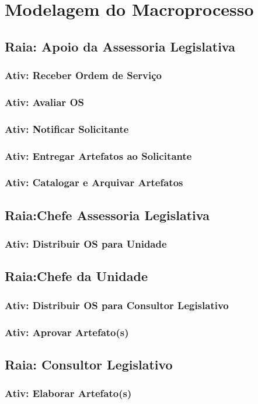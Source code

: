 \chapter{Modelagem do Macroprocesso}

	\section{Raia: Apoio da Assessoria Legislativa}

		\subsection{Ativ: Receber Ordem de Serviço}
		
		\subsection{Ativ: Avaliar OS}
				
		\subsection{Ativ: Notificar Solicitante}
		
		\subsection{Ativ: Entregar Artefatos ao Solicitante}		
		
		\subsection{Ativ: Catalogar e Arquivar Artefatos}		


	\section{Raia:Chefe Assessoria Legislativa}

		\subsection{Ativ: Distribuir OS para Unidade}		


	\section{Raia:Chefe da Unidade}

		\subsection{Ativ: Distribuir OS para Consultor Legislativo}		
		
		\subsection{Ativ: Aprovar Artefato(s)}		
		

	\section{Raia: Consultor Legislativo}

		\subsection{Ativ: Elaborar Artefato(s)}

